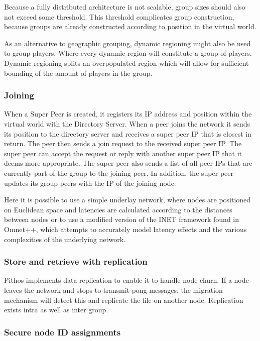 \documentclass[10pt,a4paper,conference]{IEEEtran}
\begin{document}
Because a fully distributed architecture is not scalable, group sizes should also not exceed some threshold. This threshold complicates group
construction, because groups are already constructed according to position in the virtual world.

As an alternative to geographic grouping, dynamic regioning might also be used to group players. Where every dynamic region will constitute a group
of players. Dynamic regioning splits an overpopulated region which will allow for sufficient bounding of the amount of players in the group.


\subsubsection{Joining}

When a Super Peer is created, it registers its IP address and position within the virtual world with the Directory Server. When a peer joins the
network it sends its position to the directory server and receives a super peer IP that is closest in return. The peer then sends a join request to
the received super peer IP. The super peer can accept the request or reply with another super peer IP that it deems more appropriate. The super peer
also sends a list of all peer IPs that are currently part of the group to the joining peer. In addition, the super peer updates its group peers with
the IP of the joining node.

Here it is possible to use a simple underlay network, where nodes are positioned on Euclidean space and latencies are calculated according to the
distances between nodes or to use a modified version of the INET framework found in Omnet++, which attempts to accurately model latency effects and
the various complexities of the underlying network.

\subsubsection{Store and retrieve with replication}

Pithos implements data replication to enable it to handle node churn. If a node leaves the network and stops to transmit pong messages, the migration
mechanism will detect this and replicate the file on another node. Replication exists intra as well as inter group.

\subsubsection{Secure node ID assignments}
\end{document}
